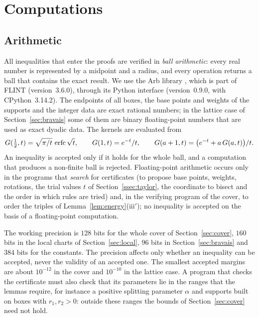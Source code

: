 \section{Computations}\label{sec:computation}

\subsection{Arithmetic}\label{ssec:arith}

All inequalities that enter the proofs are verified in \emph{ball arithmetic}: every real number is represented by a midpoint and a
radius, and every operation returns a ball that contains the exact result. We use the Arb library \cite{Johansson2017Arb}, which is
part of FLINT \cite{flint} (version~3.6.0), through its Python interface \cite{pythonflint} (version~0.9.0, with CPython~3.14.2). The
endpoints of all boxes, the base points and weights of the supports and the integer data are exact rational numbers; in the lattice
case of Section~\ref{sec:bravais} some of them are binary floating-point numbers that are used as exact dyadic data. The kernels are
evaluated from
\[
  G(\tfrac12,t)=\sqrt{\pi/t}\,\operatorname{erfc}\sqrt t,\qquad G(1,t)=e^{-t}/t,\qquad G(a+1,t)=\bigl(e^{-t}+a\,G(a,t)\bigr)/t .
\]
An inequality is accepted only if it holds for the whole ball, and a computation that produces a non-finite ball is rejected.
Floating-point arithmetic occurs only in the programs that \emph{search} for certificates (to propose base points, weights,
rotations, the trial values $t$ of Section~\ref{ssec:taylor}, the coordinate to bisect and the order in which rules are tried)
and, in the verifying program of the cover, to order the triples of Lemma~\ref{lem:energy}(iii$'$); no inequality is accepted on
the basis of a floating-point computation.

The working precision is $128$ bits for the whole cover of Section~\ref{sec:cover}, $160$ bits in the local charts of
Section~\ref{sec:local}, $96$ bits in Section~\ref{sec:bravais} and $384$ bits for the constants. The precision affects
only whether an inequality can be accepted, never the validity of an accepted one. The smallest accepted margins are
about $10^{-12}$ in the cover and $10^{-10}$ in the lattice case. A program that checks the certificate must also check that its
parameters lie in the ranges that the lemmas require, for instance a positive splitting parameter $\alpha$ and supports built on
boxes with $r_1,r_2>0$: outside these ranges the bounds of Section~\ref{sec:cover} need not hold.

